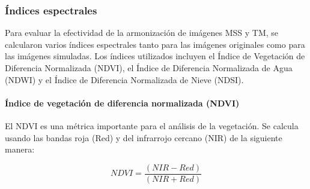             \subsubsection{Índices espectrales} 

                Para evaluar la efectividad de la armonización de imágenes MSS y TM, se calcularon varios índices espectrales tanto para las imágenes originales como para las imágenes simuladas. Los índices utilizados incluyen el Índice de Vegetación de Diferencia Normalizada (NDVI), el Índice de Diferencia Normalizada de Agua (NDWI) y el Índice de Diferencia Normalizada de Nieve (NDSI).

                \paragraph{Índice de vegetación de diferencia normalizada (NDVI)}

                    El NDVI es una métrica importante para el análisis de la vegetación. Se calcula usando las bandas roja (Red) y del infrarrojo cercano (NIR) de la siguiente manera:

                    \begin{equation}
                        NDVI = \frac{(NIR - Red)}{(NIR + Red)}
                    \end{equation}

